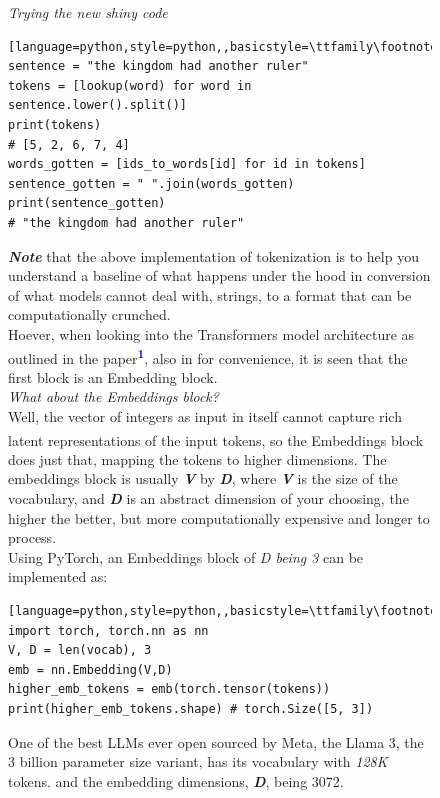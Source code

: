 \documentclass[12pt]{article}
\newcommand{\customtext}[3]{%
    \vspace{#2} %
    \fontsize{13}{8}\textcolor{#1}{\textit{#3}}%
}
\newcommand{\bandi}[1]{\textbf{\textit{#1}}}
\newcommand{\sidecite}[1]{\textsuperscript{\textcolor{blue}{\textbf{\scriptsize#1}}}}
\newcommand{\maincitecount}{\sidecite{\stepcounter{maincite}\themaincite}}
\begin{document}
\begin{figure}[!htb]
    \begin{minipage}[t]{0.65\textwidth}
    \raggedright
    \customtext{xtitle}{0em}{Trying the new shiny code}\\
\begin{lstlisting}[language=python,style=python,,basicstyle=\ttfamily\footnotesize]
sentence = "the kingdom had another ruler"
tokens = [lookup(word) for word in sentence.lower().split()]
print(tokens)
# [5, 2, 6, 7, 4]
words_gotten = [ids_to_words[id] for id in tokens]
sentence_gotten = " ".join(words_gotten)
print(sentence_gotten)
# "the kingdom had another ruler"
\end{lstlisting}
\textbf{\textit{\small Note}} that the above implementation of tokenization is to help you understand a baseline of what happens 
under the hood in conversion of what models cannot deal with, strings, to a format that can be computationally 
crunched.\\
Hoever, when looking into the Transformers model architecture as outlined in the paper\sidecite{1}, also in{\maincitecount}
for convenience, it is seen that the first block is an Embedding block.\\
\customtext{xtitle}{1em}{What about the Embeddings block?}\\
Well, the vector of integers as input in itself cannot capture rich latent representations of the input tokens, 
so the Embeddings block{\maincitecount} does just that, mapping the tokens to higher dimensions. The embeddings block is usually 
\bandi{V} by \bandi{D}, where \bandi{V} is the size of the vocabulary, and \bandi{D} is an abstract dimension of your choosing, 
the higher the better, but more computationally expensive and longer to process.\\
Using PyTorch, an Embeddings block of {\it D being 3} can be implemented as:
\begin{lstlisting}[language=python,style=python,,basicstyle=\ttfamily\footnotesize]
import torch, torch.nn as nn 
V, D = len(vocab), 3
emb = nn.Embedding(V,D)
higher_emb_tokens = emb(torch.tensor(tokens))
print(higher_emb_tokens.shape) # torch.Size([5, 3])
\end{lstlisting}
One of the best LLMs ever open sourced by Meta, the Llama 3, the 3 billion parameter size variant, has its vocabulary with {\it 128K} tokens.
and the embedding dimensions, \bandi{D}, being 3072.
    \end{minipage}%
    \hspace{25pt}
    \begin{minipage}[t]{.4\textwidth}

\end{minipage}
\end{figure}
\end{document}
